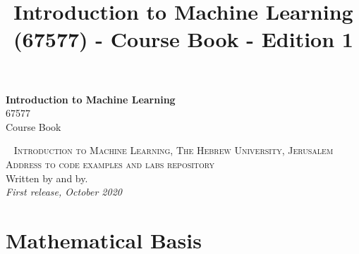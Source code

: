 \documentclass[11pt,fleqn]{book} %
\begin{document}
\title{Introduction to Machine Learning (67577) - Course Book - Edition 1}


\begingroup
\thispagestyle{empty}
\centering
\vspace*{5cm}
\par\normalfont\fontsize{35}{35}\sffamily\selectfont
\textbf{Introduction to Machine Learning}\\
{\LARGE 67577\\Course Book}\par %
\vspace*{1cm}
\endgroup


\newpage
~\vfill
\thispagestyle{empty}
\noindent \textsc{Introduction to Machine Learning, The Hebrew University, Jerusalem}\\

\noindent \textsc{Address to code examples and labs repository}\\ %

\noindent Written by and by.\\ %

\noindent \textit{First release, October 2020} %


\pagestyle{empty} %
\tableofcontents %
\cleardoublepage %
\pagestyle{fancy} %

\chapter{Mathematical Basis}
\end{document}
